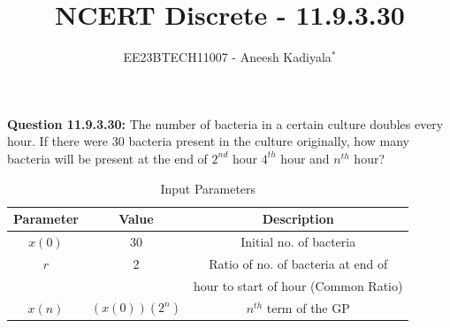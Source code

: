 \documentclass[journal,12pt,twocolumn]{IEEEtran}
\theoremstyle{remark}
\begin{document}

\vspace{3cm}

\title{NCERT Discrete - 11.9.3.30}
\author{EE23BTECH11007 - Aneesh Kadiyala$^{*}$%
}
\maketitle
\newpage
\bigskip

\renewcommand{\thefigure}{\theenumi}
\renewcommand{\thetable}{\theenumi}

\vspace{3cm}
\textbf{Question 11.9.3.30:} The number of bacteria in a certain culture doubles every hour. If there were 30 bacteria present in the culture originally, how many bacteria will be present at the end of $2^{nd}$ hour $4^{th}$ hour and $n^{th}$ hour?
\\
\solution

\begin{table}[h!]
    \centering
    \caption{Input Parameters}
    \label{tab:1}
    \begin{tabular}{ | c | c | c | }
        \hline
        Parameter & Value & Description \\
        \hline
        $x(0)$ & 30 & Initial no. of bacteria\\
        \hline
        $r$ & 2 & Ratio of no. of bacteria at end of \\
        & & hour to start of hour (Common Ratio) \\
        \hline
        $x(n)$ & $(x(0))(2^n)$ & $n^{th}$ term of the GP \\
        \hline
    \end{tabular}
\end{table}
\end{document}
